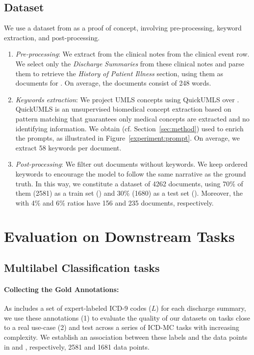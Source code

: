 \subsection{Dataset}
\label{subsec:dataset}
We use a dataset from \mimic as a proof of concept, involving pre-processing, keyword extraction, and post-processing.
\begin{enumerate}
    \item \textit{Pre-processing}: We extract from \mimic the clinical notes from the clinical event row. We select only the \textit{Discharge Summaries} from these clinical notes and parse them to retrieve the \textit{History of Patient Illness} section, using them as documents for \dgen. On average, the documents consist of 248 words.
    
    \item \textit{Keywords extraction}: We project UMLS concepts using QuickUMLS over \dgen. QuickUMLS is an unsupervised biomedical concept extraction based on pattern matching that guarantees only medical concepts are extracted and no identifying information. We obtain \kgen (cf. Section~\ref{sec:method}) used to enrich the prompts, as illustrated in Figure~\ref{experiment:prompt}. On average, we extract 58 keywords per document.
    
    \item \textit{Post-processing}: We filter out documents without keywords. We keep ordered keywords to encourage the model to follow the same narrative as the ground truth.
    In this way, we constitute a dataset of 4262 documents, using 70\% of them (2581) as a train set (\dtr) and 30\% (1680) as a test set (\dte). Moreover, the \dsft with 4\% and 6\% ratios have 156 and 235 documents, respectively.
\end{enumerate}

\section{Evaluation on Downstream Tasks}
\subsection{Multilabel Classification tasks}
\label{subsec:multitask}
\paragraph{Collecting the Gold Annotations:}
As \mimic includes a set of expert-labeled ICD-9 codes ($L$) for each discharge summary, we use these annotations (1) to evaluate the quality of our datasets on tasks close to a real use-case (2) and test across a series of ICD-MC tasks with increasing complexity. We establish an association between these labels and the data points in \dtr and \dte, respectively, 2581 and 1681 data points.

